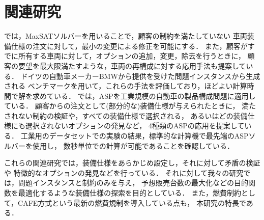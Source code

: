 \section{関連研究}
\cite{walter13:ceur}では，MaxSATソルバーを用いることで，顧客の制約を満たしていない
車両装備仕様の注文に対して，最小の変更による修正を可能にする．
また，顧客がすでに所有する車両に対して，オプションの追加，変更，除去を行うときに，
顧客の要望を最大限満たすような，車両の再構成に対する応用手法も提案している．
ドイツの自動車メーカーBMWから提供を受けた問題インスタンスから生成される
ベンチマークを用いて，これらの手法を評価しており，ほどよい計算時間で解を求めている．
\cite{genay19:jim}では，ASPを工業規模の自動車の製品構成問題に適用している．
顧客からの注文として(部分的な)装備仕様が与えられたときに，
満たされない制約の検証や，すべての装備仕様で選択される，
あるいはどの装備仕様にも選択されないオプションの発見など，
4種類のASPの応用を提案している．
工業用のデータセットでの実験の結果，標準的な計算機で最先端のASPソルバーを使用し，
数秒単位での計算が可能であることを確認している．

これらの関連研究では，装備仕様をあらかじめ設定し，それに対して矛盾の検証や
特徴的なオプションの発見などを行っている．
それに対して我々の研究では，問題インスタンスと制約のみを与え，
予想販売台数の最大化などの目的関数を最適化するような装備仕様の探索を目的としている．
また，燃費制約として，CAFE方式という最新の燃費規制を導入している点も，
本研究の特長である．
